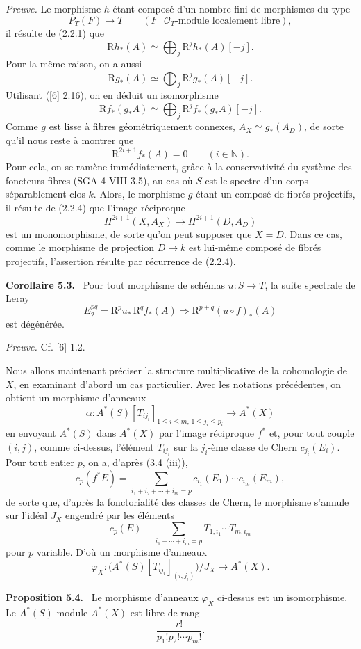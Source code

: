 \documentclass[11pt]{article}
\newenvironment{statement}[1]{\par\medskip\noindent\textbf{#1.}\ }{\par\medskip}
\newcommand{\R}{\mathrm{R}}\newcommand{\RHomCore}{\mathrm{RHom}}
\providecommand{\R}{\mathrm R}
\begin{document}
\emph{Preuve.} Le morphisme $h$ étant composé d'un nombre fini de morphismes du type
\[
P_T(F)\to T\qquad (F\text{ }\mathcal O_T\text{-module localement libre}),
\tag{Q}
\]
il résulte de (2.2.1) que
\[
\R h_*(A)\simeq\bigoplus_j \R^jh_*(A)[-j].
\]
Pour la même raison, on a aussi
\[
\R g_*(A)\simeq\bigoplus_j \R^jg_*(A)[-j].
\]
Utilisant ([6] 2.16), on en déduit un isomorphisme
\[
\R f_*(g_*A)\simeq\bigoplus_j \R^j f_*(g_*A)[-j].
\]
Comme $g$ est lisse à fibres géométriquement connexes, $A_X\simeq g_*(A_D)$, de sorte qu'il nous reste à montrer que
\[
\R^{2i+1}f_*(A)=0\qquad (i\in\mathbb N).
\tag{5.2.1}
\]
Pour cela, on se ramène immédiatement, grâce à la conservativité du système des foncteurs fibres (SGA 4 VIII 3.5), au cas où $S$ est le spectre d'un corps séparablement clos $k$. Alors, le morphisme $g$ étant un composé de fibrés projectifs, il résulte de (2.2.4) que l'image réciproque
\[
H^{2i+1}(X,A_X)\to H^{2i+1}(D,A_D)
\]
est un monomorphisme, de sorte qu'on peut supposer que $X=D$. Dans ce cas, comme le morphisme de projection $D\to k$ est lui-même composé de fibrés projectifs, l'assertion résulte par récurrence de (2.2.4).

\begin{statement}{Corollaire 5.3}
Pour tout morphisme de schémas $u:S\to T$, la suite spectrale de Leray
\[
E_2^{pq}=\R^p u_*\,\R^q f_*(A)\Rightarrow \R^{p+q}(u\circ f)_*(A)
\]
est dégénérée.
\end{statement}

\emph{Preuve.} Cf. [6] 1.2.

Nous allons maintenant préciser la structure multiplicative de la cohomologie de $X$, en examinant d'abord un cas particulier. Avec les notations précédentes, on obtient un morphisme d'anneaux
\[
\alpha:A^*(S)[T_{ij_i}]_{1\le i\le m,\,1\le j_i\le p_i}\to A^*(X)
\]
en envoyant $A^*(S)$ dans $A^*(X)$ par l'image réciproque $f^*$ et, pour tout couple $(i,j)$, comme ci-dessus, l'élément $T_{ij_i}$ sur la $j_i$-ème classe de Chern $c_{j_i}(E_i)$. Pour tout entier $p$, on a, d'après (3.4 (iii)),
\[
c_p(f^*E)=\sum_{i_1+i_2+\cdots+i_m=p}c_{i_1}(E_1)\cdots c_{i_m}(E_m),
\]
de sorte que, d'après la fonctorialité des classes de Chern, le morphisme s'annule sur l'idéal $J_X$ engendré par les éléments
\[
c_p(E)-\sum_{i_1+\cdots+i_m=p}T_{1,i_1}\cdots T_{m,i_m}
\]
pour $p$ variable. D'où un morphisme d'anneaux
\[
\varphi_X:\bigl(A^*(S)[T_{ij_i}]_{(i,j_i)}\bigr)/J_X\to A^*(X).
\]

\begin{statement}{Proposition 5.4}
Le morphisme d'anneaux $\varphi_X$ ci-dessus est un isomorphisme. Le $A^*(S)$-module $A^*(X)$ est libre de rang
\[
\frac{r!}{p_1!p_2!\cdots p_m!}.
\]
\end{statement}
\end{document}
